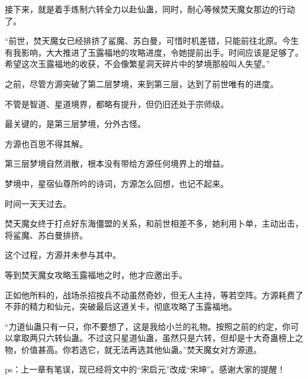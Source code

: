 \begin{this_body}
接下来，就是着手炼制六转全力以赴仙蛊，同时，耐心等候焚天魔女那边的行动了。

“前世，焚天魔女已经排挤了鲨魔、苏白曼，可惜时机差错，只能前往北原。今生有我影响，大大推进了玉露福地的攻略进度，令她提前出手。时间应该是足够了。希望这次玉露福地的收获，不会像繁星洞天碎片中的梦境那般叫人失望。”

之前，尽管方源突破了第二层梦境，来到第三层，达到了前世唯有的进度。

不管是智道、星道境界，都略有提升，但仍旧还处于宗师级。

最关键的，是第三层梦境，分外古怪。

方源也百思不得其解。

第三层梦境自然消散，根本没有带给方源任何境界上的增益。

梦境中，星宿仙尊所吟的诗词，方源怎么回想，也记不起来。

时间一天天过去。

焚天魔女终于打点好东海僵盟的关系，和前世相差不多，她利用卜单，主动出击，将鲨魔、苏白曼排挤。

这个过程，方源并未参与其中。

等到焚天魔女攻略玉露福地之时，他才应邀出手。

正如他所料的，战场杀招按兵不动虽然奇妙，但无人主持，等若空阵。方源耗费了不菲的精力和仙元，突破最后这道关卡，彻底攻略了玉露福地。

“力道仙蛊只有一只，你不要想了，这是我给小兰的礼物。按照之前的约定，你可以拿取两只六转仙蛊。不过这只星道仙蛊，虽然只是六转，但却是十大奇蛊榜上之物，价值甚高。你若选它，就无法再选其他仙蛊。”焚天魔女对方源道。

ps：上一章有笔误，现已经将文中的“宋启元”改成“宋坤”。感谢大家的提醒！

\end{this_body}

